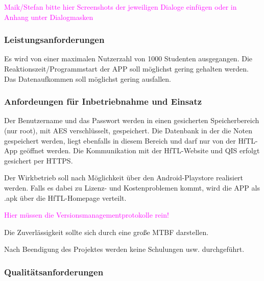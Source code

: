 \textcolor{magenta}{Maik/Stefan bitte hier Screenshots der jeweiligen Dialoge einfügen oder in Anhang unter Dialogmasken}





\subsubsection{\textbf{Leistungsanforderungen}}
Es wird von einer maximalen Nutzerzahl von 1000 Studenten ausgegangen.
Die Reaktionszeit/Programmstart der APP soll möglichst gering gehalten werden.
Das Datenaufkommen soll möglichst gering ausfallen.


\subsubsection{\textbf{Anfordeungen für Inbetriebnahme und Einsatz}}

Der Benutzername und das Passwort werden in einen gesicherten Speicherbereich (nur root), mit \acs{AES} verschlüsselt, gespeichert.
Die Datenbank in der die Noten gespeichert werden, liegt ebenfalls in diesem Bereich und darf nur von der \acs{HfTL}-App geöffnet werden.
Die Kommunikation mit der \acs{HfTL}-Website und \acs{QIS} erfolgt gesichert per \acs{HTTPS}.




Der Wirkbetrieb soll nach Möglichkeit über den Android-Playstore realisiert werden. Falls es dabei zu Lizenz- und Kostenproblemen kommt, wird die APP als \ac{.apk} über die HfTL-Homepage verteilt.



\textcolor{magenta}{Hier müssen die Versionsmanagementprotokolle rein!}




Die Zuverlässigkeit sollte sich durch eine große \ac{MTBF} darstellen.



Nach Beendigung des Projektes werden keine Schulungen usw. durchgeführt.


\subsubsection{\textbf{Qualitätsanforderungen}}

